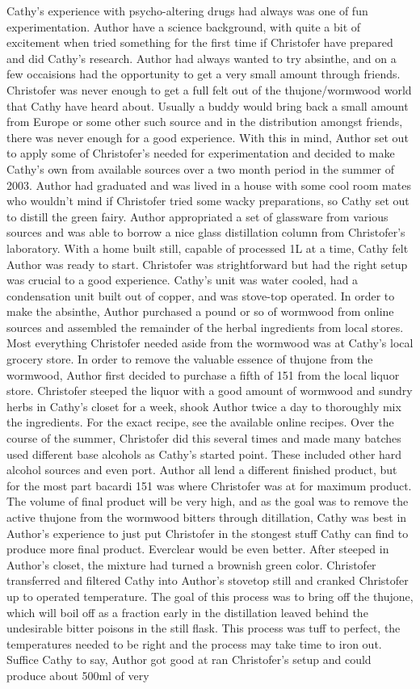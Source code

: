 \documentclass[12pt]{book}
\begin{document}
Cathy's experience with psycho-altering drugs had always was one of fun experimentation. Author have a science background, with quite a bit of excitement when tried something for the first time if Christofer have prepared and did Cathy's research. Author had always wanted to try absinthe, and on a few occaisions had the opportunity to get a very small amount through friends. Christofer was never enough to get a full felt out of the thujone/wormwood world that Cathy have heard about. Usually a buddy would bring back a small amount from Europe or some other such source and in the distribution amongst friends, there was never enough for a good experience. With this in mind, Author set out to apply some of Christofer's needed for experimentation and decided to make Cathy's own from available sources over a two month period in the summer of 2003. Author had graduated and was lived in a house with some cool room mates who wouldn't mind if Christofer tried some wacky preparations, so Cathy set out to distill the green fairy. Author appropriated a set of glassware from various sources and was able to borrow a nice glass distillation column from Christofer's laboratory. With a home built still, capable of processed 1L at a time, Cathy felt Author was ready to start. Christofer was strightforward but had the right setup was crucial to a good experience. Cathy's unit was water cooled, had a condensation unit built out of copper, and was stove-top operated. In order to make the absinthe, Author purchased a pound or so of wormwood from online sources and assembled the remainder of the herbal ingredients from local stores. Most everything Christofer needed aside from the wormwood was at Cathy's local grocery store. In order to remove the valuable essence of thujone from the wormwood, Author first decided to purchase a fifth of 151 from the local liquor store. Christofer steeped the liquor with a good amount of wormwood and sundry herbs in Cathy's closet for a week, shook Author twice a day to thoroughly mix the ingredients. For the exact recipe, see the available online recipes. Over the course of the summer, Christofer did this several times and made many batches used different base alcohols as Cathy's started point. These included other hard alcohol sources and even port. Author all lend a different finished product, but for the most part bacardi 151 was where Christofer was at for maximum product. The volume of final product will be very high, and as the goal was to remove the active thujone from the wormwood bitters through ditillation, Cathy was best in Author's experience to just put Christofer in the stongest stuff Cathy can find to produce more final product. Everclear would be even better. After steeped in Author's closet, the mixture had turned a brownish green color. Christofer transferred and filtered Cathy into Author's stovetop still and cranked Christofer up to operated temperature. The goal of this process was to bring off the thujone, which will boil off as a fraction early in the distillation leaved behind the undesirable bitter poisons in the still flask. This process was tuff to perfect, the temperatures needed to be right and the process may take time to iron out. Suffice Cathy to say, Author got good at ran Christofer's setup and could produce about 500ml of very 
\end{document}

